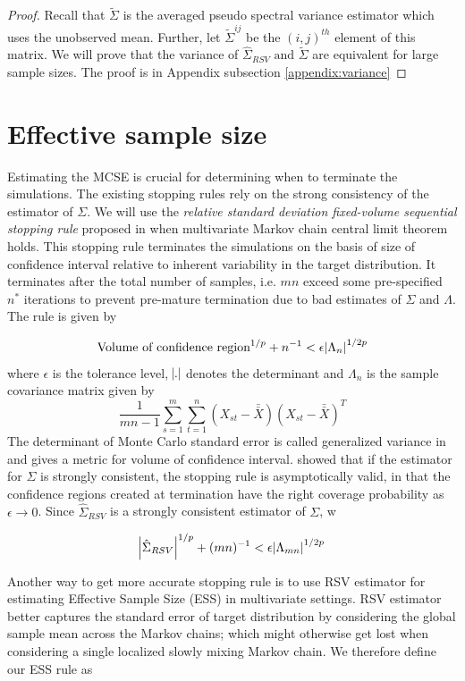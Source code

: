 \documentclass[11pt]{article}
\theoremstyle{remark}
\begin{document}
\begin{proof}
Recall that $\tilde{\Sigma}$ is the averaged pseudo spectral variance estimator which uses the unobserved mean. Further, let $\tilde{\Sigma}^{ij}$ be the $(i,j)^{th}$ element of this matrix. We will prove that the variance of $\hat{\Sigma}_{RSV} \textrm{ and } \tilde{\Sigma}$ are equivalent for large sample sizes. The proof is in Appendix subsection \ref{appendix:variance}
\end{proof}


\section{Effective sample size} \label{sec:ess}

Estimating the MCSE is crucial for determining when to terminate the simulations. The existing stopping rules rely on the strong consistency of the estimator of $\Sigma$. We will use the \textit{relative standard deviation fixed-volume sequential stopping rule} proposed in \cite{vats2019multivariate} when multivariate Markov chain central limit theorem holds. This stopping rule terminates the simulations on the basis of size of confidence interval relative to inherent variability in the target distribution. It terminates after the total number of samples, i.e. $mn$ exceed some pre-specified $n^*$ iterations to prevent pre-mature termination due to bad estimates of $\Sigma$ and $\Lambda$. The rule is given by

\[
\textrm{Volume of confidence region}^{1/p} + n^{-1} < \epsilon \abs{\Lambda_n}^{1/2p} 
\]
%
where $\epsilon$ is the tolerance level, $\abs{.}$ denotes the determinant and $\Lambda_n$ is the sample covariance matrix given by
%
\[
\dfrac{1}{mn-1}\sum_{s=1}^{m}\sum_{t=1}^{n}(X_{st} - \bar{\bar{X}})(X_{st} - \bar{\bar{X}})^T
\]
%
The determinant of Monte Carlo standard error is called generalized variance in  \cite{wilks1932certain} and gives a metric for volume of confidence interval. \cite{vats2019multivariate} showed that if the estimator for $\Sigma$ is strongly consistent, the stopping rule is asymptotically valid, in that the confidence regions created at termination have the right coverage probability as $\epsilon \to 0$. Since $\hat{\Sigma}_{RSV}$ is a strongly consistent estimator of $\Sigma$, w

\[
\abs{\hat{\Sigma}_{RSV}}^{1/p} + (mn)^{-1} < \epsilon \abs{\Lambda_{mn}}^{1/2p}
\]

Another way to get more accurate stopping rule is to use RSV estimator for estimating Effective Sample Size (ESS) in multivariate settings. RSV estimator better captures the standard error of target distribution by considering the global sample mean across the Markov chains; which might otherwise get lost when considering a single localized slowly mixing Markov chain. We therefore define our ESS rule as
\end{document}

